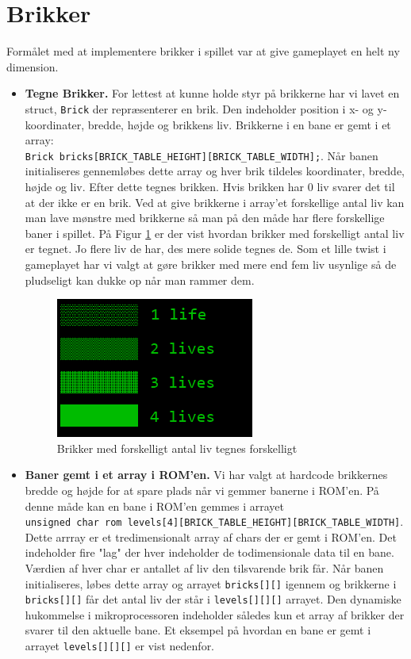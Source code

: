 \ngeq\section{Brikker}

Formålet med at implementere brikker i spillet var at give gameplayet en helt ny dimension. 

\begin{itemize}
\item \textbf{Tegne Brikker.} For lettest at kunne holde styr på brikkerne har vi lavet en struct, \texttt{Brick} der repræsenterer en brik. Den indeholder position i x- og y-koordinater, bredde, højde og brikkens liv. Brikkerne i en bane er gemt i et array:\\ \texttt{Brick bricks[BRICK\_TABLE\_HEIGHT][BRICK\_TABLE\_WIDTH];}. Når banen initialiseres gennemløbes dette array og hver brik tildeles koordinater, bredde, højde og liv. Efter dette tegnes brikken. Hvis brikken har 0 liv svarer det til at der ikke er en brik. Ved at give brikkerne i array'et forskellige antal liv kan man lave mønstre med brikkerne så man på den måde har flere forskellige baner i spillet. På Figur \ref{fig:brikker} er der vist hvordan brikker med forskelligt antal liv er tegnet. Jo flere liv de har, des mere solide tegnes de. Som et lille twist i gameplayet har vi valgt at gøre brikker med mere end fem liv usynlige så de pludseligt kan dukke op når man rammer dem. 
\begin{figure}[h!]
\centering
\includegraphics[scale=1]{figs/brikker.png}
\caption{Brikker med forskelligt antal liv tegnes forskelligt}
\label{fig:brikker}
\end{figure}
\item \textbf{Baner gemt i et array i ROM'en.} Vi har valgt at hardcode brikkernes bredde og højde for at spare plads når vi gemmer banerne i ROM'en. På denne måde kan en bane i ROM'en gemmes i arrayet\\ \texttt{unsigned char rom levels[4][BRICK\_TABLE\_HEIGHT][BRICK\_TABLE\_WIDTH]}. Dette arrray er et tredimensionalt array af chars der er gemt i ROM'en. Det indeholder fire "lag" der hver indeholder de todimensionale data til en bane. Værdien af hver char er antallet af liv den tilsvarende brik får. Når banen initialiseres, løbes dette array og arrayet \texttt{bricks[][]} igennem og brikkerne i \texttt{bricks[][]} får det antal liv der står i \texttt{levels[][][]} arrayet. Den dynamiske hukommelse i mikroprocessoren indeholder således kun et array af brikker der svarer til den aktuelle bane. Et eksempel på hvordan en bane er gemt i arrayet \texttt{levels[][][]} er vist nedenfor. 

\end{itemize}
